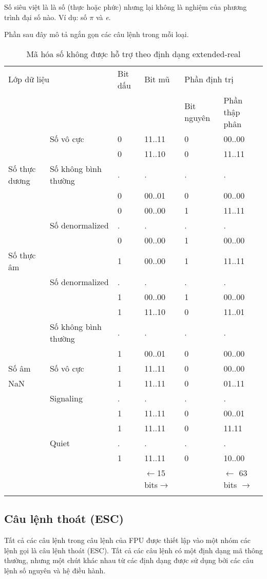 	Số siêu việt là là số (thực hoặc phức) nhưng lại không là nghiệm của phương trình đại số nào. Ví dụ: số $\pi $ và \textit{e}. 	
		
	Phần sau đây mô tả ngắn gọn các câu lệnh trong mỗi loại. 
	\begin{longtable}{|m{2cm}|m{3cm}|l|l|l|l|}
	\hline
		\multicolumn{2}{|l|}{Lớp dữ liệu} & Bit dấu & Bit mũ & \multicolumn{2}{l|}{Phần định trị}\\
		\cline{5-6}
		 \multicolumn{2}{|l|}{} & & & Bit nguyên & Phần thập phân \\
	\hline
	\hline
		& Số vô cực &0 &  11..11 & 0 & 00..00 \\
		\cline{2-6}
		 &  & 0 &11..10 & 0 & 11..11 \\		
		 Số thực dương  &Số không bình thường & . & . & . & . \\
		  &	&0 &00..01& 0&  00..00 \\		 
		 \cline{2-6}
		 & & 0 & 00..00 & 1 & 11..11\\			
		 & Số denormalized  & . & . & . & . \\
		 &	&0 &00..00& 1 &  00..00 \\		
	\hline
		Số thực âm &   & 1 &00..00 & 1 & 11..11 \\		
		 & Số denormalized  & . & . & . & . \\
		 &	& 1  &00..00& 1 &  00..00 \\		
		\cline{2-6}
		 &  &  1 &11..10 & 0 &11..01\\
		  & Số không bình thường  & . & . & . & . \\
		 &	& 1  &00..01 & 0 &  00..00 \\		
		 \cline{1-6}
		 Số âm & Số vô cực  & 1 & 11..11 & 0 & 00..00\\
	\hline
		NaN&  & 1  &11..11 & 0 & 01..11 \\
		& Signaling  & . & . & . & . \\
		 &	& 1  &11..11& 0 &  00..01 \\		
	\hline		
		 & & 1 & 11..11 & 0 & 11.11\\
		 &  Quiet  & . & . & . & . \\
		 &	& 1  &11..11& 0 &  10..00 \\		
	\hline
		 \multicolumn{3}{l|}{} & $\leftarrow$15 bits$\to$ & & $\leftarrow$ 63 bits $\to$ \\
		\caption{Mã hóa số không được hỗ trợ  theo định dạng extended-real}
		\label{tb:MaHoaExtended}
	\end{longtable}
	
		\subsection*{ Câu lệnh thoát (ESC)}
	Tất cả các câu lệnh trong câu lệnh của FPU được thiết lập vào một nhóm các lệnh gọi là câu lệnh thoát (ESC). Tất cả các câu lệnh có một định dạng mã thông thường, nhưng một chút khác nhau từ các định dạng được sử dụng bởi các câu lệnh số nguyên và hệ điều hành.
	
